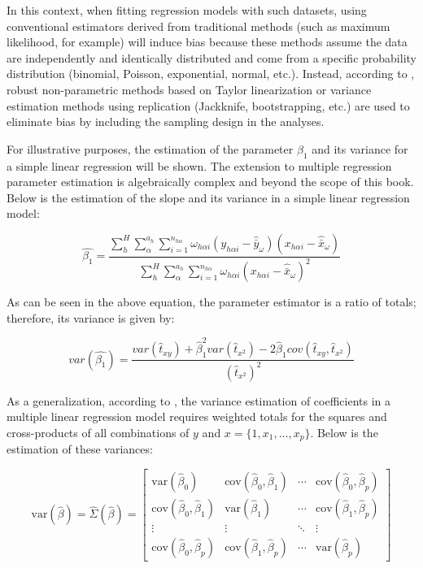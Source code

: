 \documentclass[
  12pt,
]{book}
\begin{document}
In this context, when fitting regression models with such datasets, using conventional estimators derived from traditional methods (such as maximum likelihood, for example) will induce bias because these methods assume the data are independently and identically distributed and come from a specific probability distribution (binomial, Poisson, exponential, normal, etc.). Instead, according to \citet{Wolter_2007}, robust non-parametric methods based on Taylor linearization or variance estimation methods using replication (Jackknife, bootstrapping, etc.) are used to eliminate bias by including the sampling design in the analyses.

For illustrative purposes, the estimation of the parameter \(\beta_{1}\) and its variance for a simple linear regression will be shown. The extension to multiple regression parameter estimation is algebraically complex and beyond the scope of this book. Below is the estimation of the slope and its variance in a simple linear regression model:

\[
\hat{\beta_{1}} = \frac{\sum_{h}^{H}\sum_{\alpha}^{a_{h}}\sum_{i=1}^{n_{h\alpha}}\omega_{h\alpha i}\left(y_{h\alpha i}-\hat{\bar{y}}_{\omega}\right)\left(x_{h\alpha i}-\hat{\bar{x}}_{\omega}\right)}{\sum_{h}^{H}\sum_{\alpha}^{a_{h}}\sum_{i=1}^{n_{h\alpha}}\omega_{h\alpha i}\left(x_{h\alpha i}-\hat{\bar{x}}_{\omega}\right)^{2}}
\]

As can be seen in the above equation, the parameter estimator is a ratio of totals; therefore, its variance is given by:

\[
var\left(\hat{\beta_{1}}\right)  =  \frac{var\left(\hat{t}_{xy}\right)+\hat{\beta}_{1}^{2}var\left(\hat{t}_{x^{2}}\right)-2\hat{\beta}_{1}cov\left(\hat{t}_{xy},\hat{t}_{x^{2}}\right)}{\left(\hat{t}_{x^{2}}\right)^{2}}
\]

As a generalization, according to \citet{kish1974inference}, the variance estimation of coefficients in a multiple linear regression model requires weighted totals for the squares and cross-products of all combinations of \(y\) and \(x = \{1, x_{1}, \ldots, x_{p}\}\). Below is the estimation of these variances:

\[
\text{var}\left(\hat{\beta}\right) = \hat{\Sigma}\left(\hat{\beta}\right) = 
\begin{bmatrix}
\text{var}\left(\hat{\beta}_{0}\right) & \text{cov}\left(\hat{\beta}_{0},\hat{\beta}_{1}\right) & \cdots & \text{cov}\left(\hat{\beta}_{0},\hat{\beta}_{p}\right) \\
\text{cov}\left(\hat{\beta}_{0},\hat{\beta}_{1}\right) & \text{var}\left(\hat{\beta}_{1}\right) & \cdots & \text{cov}\left(\hat{\beta}_{1},\hat{\beta}_{p}\right) \\
\vdots & \vdots & \ddots & \vdots \\
\text{cov}\left(\hat{\beta}_{0},\hat{\beta}_{p}\right) & \text{cov}\left(\hat{\beta}_{1},\hat{\beta}_{p}\right) & \cdots & \text{var}\left(\hat{\beta}_{p}\right)
\end{bmatrix}
\]
\end{document}
